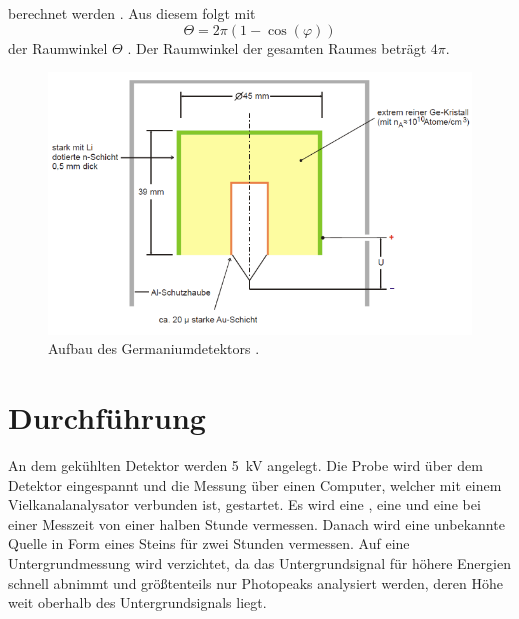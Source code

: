 berechnet werden \cite{wiki:Kegelwinkel}.
Aus diesem folgt mit
\begin{equation}
  \Theta = 2 \pi (1-\cos(\varphi))
  \label{eqn:Raumwinkel}
\end{equation}
der Raumwinkel $\Theta$ \cite{wiki:Theta}. Der Raumwinkel der gesamten Raumes beträgt $4\pi$.

\begin{figure}[H]
  \centering
  \includegraphics[width = .7\textwidth]{Aufbau.png}
  \caption{Aufbau des Germaniumdetektors \cite{Aufbau}.}
  \label{fig:Aufbau}
\end{figure}

\section{Durchführung}
An dem gekühlten Detektor werden \SI{5}{\kilo\volt} angelegt.
Die Probe wird über dem Detektor eingespannt und die Messung über einen Computer, welcher mit einem Vielkanalanalysator verbunden ist, gestartet.
Es wird eine , eine  und eine  bei einer Messzeit von einer halben Stunde vermessen.
Danach wird eine unbekannte Quelle in Form eines Steins für zwei Stunden vermessen. Auf eine Untergrundmessung wird verzichtet, da das Untergrundsignal für höhere Energien schnell abnimmt und größtenteils nur Photopeaks analysiert werden, deren Höhe weit oberhalb des Untergrundsignals liegt. 
